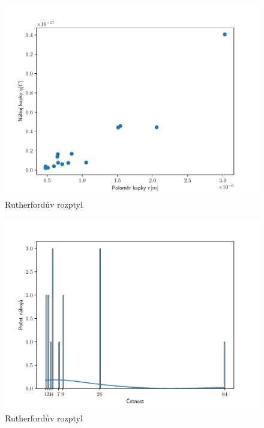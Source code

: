 \documentclass{article}
\begin{document}
\\
\vspace{1em}
\\
\begin{figure}[h]
  \includegraphics[scale=1]{data/graph1.pdf}
  \caption{Rutherfordův rozptyl}
\end{figure}
\begin{figure}[h]
  \includegraphics[scale=1]{data/hist.pdf}
  \caption{Rutherfordův rozptyl}
\end{figure}
\end{document}

